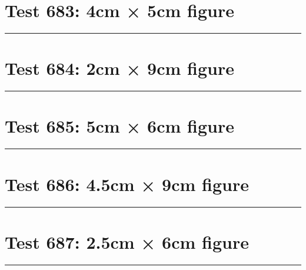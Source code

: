 \documentclass[a4paper,11pt]{article}
\begin{document}
\section*{Test 683: 4cm × 5cm figure}
\begin{swarmwrap}%
  \begin{minipage}[t]{4cm}
    \centering
    \rule{\linewidth}{5cm}
  \end{minipage}%
\end{swarmwrap}%
\swarmwrapnext
\lipsum[142]
\lipsum[143]
\lipsum[144]
\lipsum[145]
\section*{Test 684: 2cm × 9cm figure}
\begin{swarmwrap}%
  \begin{minipage}[t]{2cm}
    \centering
    \rule{\linewidth}{9cm}
  \end{minipage}%
\end{swarmwrap}%
\swarmwrapnext
\lipsum[114]
\lipsum[115]
\lipsum[116]
\lipsum[117]
\section*{Test 685: 5cm × 6cm figure}
\begin{swarmwrap}%
  \begin{minipage}[t]{5cm}
    \centering
    \rule{\linewidth}{6cm}
  \end{minipage}%
\end{swarmwrap}%
\swarmwrapnext
\lipsum[106]
\lipsum[107]
\lipsum[108]
\section*{Test 686: 4.5cm × 9cm figure}
\begin{swarmwrap}%
  \begin{minipage}[t]{4cm}
    \centering
    \rule{\linewidth}{9cm}
  \end{minipage}%
\end{swarmwrap}%
\swarmwrapnext
\lipsum[79]
\lipsum[80]
\lipsum[81]
\lipsum[82]
\section*{Test 687: 2.5cm × 6cm figure}
\begin{swarmwrap}%
  \begin{minipage}[t]{2cm}
    \centering
    \rule{\linewidth}{6cm}
  \end{minipage}%
\end{swarmwrap}%
\swarmwrapnext
\lipsum[110]
\lipsum[111]
\lipsum[112]
\lipsum[113]
\end{document}
